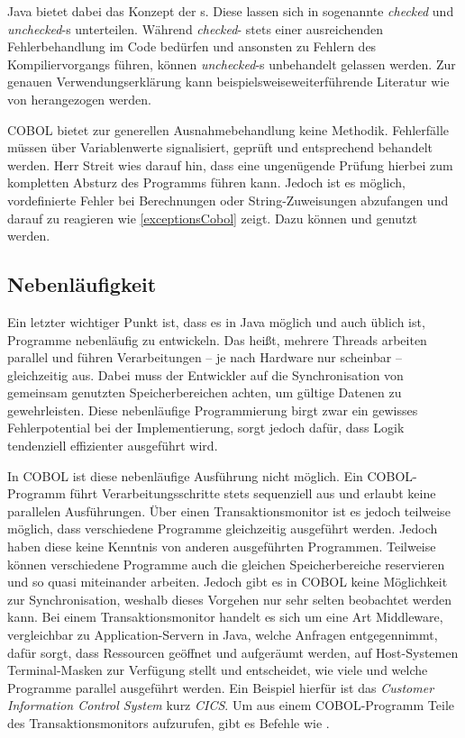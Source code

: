 Java bietet dabei das Konzept der s. Diese lassen sich in sogenannte \textit{checked} und \textit{unchecked}-s unterteilen. Während \textit{checked}- stets einer ausreichenden Fehlerbehandlung im Code bedürfen und ansonsten zu Fehlern des Kompiliervorgangs führen, können \textit{unchecked}-s unbehandelt gelassen werden. Zur genauen Verwendungserklärung kann beispielsweiseweiterführende Literatur wie  von \citeauthor{byrne_java_2009-1} herangezogen werden.

COBOL bietet zur generellen Ausnahmebehandlung keine Methodik. Fehlerfälle müssen über Variablenwerte signalisiert, geprüft und entsprechend behandelt werden. Herr Streit wies darauf hin, dass eine ungenügende Prüfung hierbei zum kompletten Absturz des Programms führen kann. Jedoch ist es möglich, vordefinierte Fehler bei Berechnungen oder String-Zuweisungen abzufangen und darauf zu reagieren wie \autoref{exceptionsCobol} zeigt. Dazu können  und  genutzt werden.


\subsection{Nebenläufigkeit}

Ein letzter wichtiger Punkt ist, dass es in Java möglich und auch üblich ist, Programme nebenläufig zu entwickeln. Das heißt, mehrere Threads arbeiten parallel und führen Verarbeitungen -- je nach Hardware nur scheinbar -- gleichzeitig aus. Dabei muss der Entwickler auf die Synchronisation von gemeinsam genutzten Speicherbereichen achten, um gültige Datenen zu gewehrleisten. Diese nebenläufige Programmierung birgt zwar ein gewisses Fehlerpotential bei der Implementierung, sorgt jedoch dafür, dass Logik tendenziell effizienter ausgeführt wird.

In COBOL ist diese nebenläufige Ausführung nicht möglich. Ein COBOL-Programm führt Verarbeitungsschritte stets sequenziell aus und erlaubt keine parallelen Ausführungen. Über einen Transaktionsmonitor ist es jedoch teilweise möglich, dass verschiedene Programme gleichzeitig ausgeführt werden. Jedoch haben diese keine Kenntnis von anderen ausgeführten Programmen. Teilweise können verschiedene Programme auch die gleichen Speicherbereiche reservieren und so quasi miteinander arbeiten. Jedoch gibt es in COBOL keine Möglichkeit zur Synchronisation, weshalb dieses Vorgehen nur sehr selten beobachtet werden kann. Bei einem Transaktionsmonitor handelt es sich um eine Art Middleware, vergleichbar zu Application-Servern in Java, welche Anfragen entgegennimmt, dafür sorgt, dass Ressourcen geöffnet und aufgeräumt werden, auf Host-Systemen Terminal-Masken zur Verfügung stellt und entscheidet, wie viele und welche Programme parallel ausgeführt werden. Ein Beispiel hierfür ist das \textit{Customer Information Control System} kurz \textit{CICS}. Um aus einem COBOL-Programm Teile des Transaktionsmonitors aufzurufen, gibt es Befehle wie . 